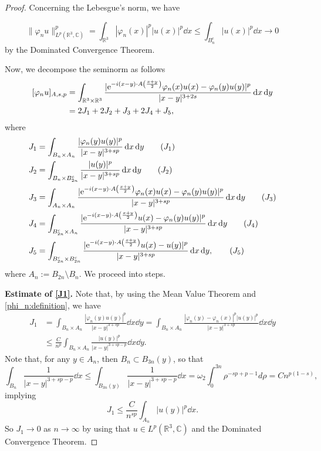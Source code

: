 \documentclass[leqno,11pt]{amsart}
\newcommand{\R}{\mathbb R}
\newcommand{\CC}{\mathbb C}
\newcommand{\C}{\mathbb C}
\numberwithin{equation}{section}
\def\e{{\rm e}}
\newcommand{\expAminus}{\e^{-i(x-y)\cdot A\left(\frac{x+y}{2}\right)}}
\begin{document}
\begin{proof}
Concerning the Lebesgue's norm, we have

$$\|\varphi_n u\|_{L^p(\R^3,\C)}^p=\int_{\R^3}|\varphi_n(x)|^p |u(x)|^p \dd x\le \int_{B_{n}^c} |u(x)|^p \dd x\to 0$$
by the Dominated Convergence Theorem.

Now, we decompose the seminorm as follows 
\begin{equation}
\begin{aligned}
    [\varphi_n u]_{A,s,p}
    &=
    \int_{\R^3 \times \R^3} \frac{|\expAminus\varphi_n(x)u(x)-\varphi_n(y)u(y)|^p}{|x-y|^{3+2s}}\dd x \dd y \\
    &=
    2J_1 + 2J_2 + J_3 +2J_4 + J_5,
\end{aligned}
\end{equation}
where
\begin{align}
       &J_1=\int_{B_n \times A_n}\frac{|\varphi_n(y)u(y)|^p}{|x-y|^{3+sp}}\dd x \dd y \label{J1}\tag{{\it $J_1$}}\\
       &J_2=\int_{B_n \times B_{2n}^c}\frac{|u(y)|^p}{|x-y|^{3+sp}}\dd x \dd y\label{J2}\tag{{\it $J_2$}}\\
       &J_3=\int_{A_n \times A_n}\frac{|\expAminus\varphi_n(x)u(x)-\varphi_n(y)u(y)|^p}{|x-y|^{3+sp}}\dd x \dd y\label{J3}\tag{{\it $J_3$}}\\
       &J_4=\int_{B_{2n}^c \times A_n}\frac{|\expAminus u(x)-\varphi_n(y)u(y)|^p}{|x-y|^{3+sp}}\dd x \dd y\label{J4}\tag{{\it $J_4$}}\\
       &J_5=\int_{B_{2n}^c \times B_{2n}^c}\frac{|\expAminus u(x)- u(y)|^p}{|x-y|^{3+sp}}\dd x \dd y,\label{J5}\tag{{\it $J_5$}}
\end{align}
where $A_n:=B_{2n}\setminus B_n$. We proceed into steps.

{\bf Estimate of \eqref{J1}.}
Note that, by using the Mean Value Theorem and \eqref{phi_n:definition}, we have
$$\begin{aligned}
J_1&=\int_{B_n \times A_n}\frac{|\varphi_n(y)u(y)|^p}{|x-y|^{3+sp}}\dd x \dd y=\int_{B_n \times A_n}\frac{|\varphi_n(y)-\varphi_n(x)|^p|u(y)|^p}{|x-y|^{3+sp}}\dd x \dd y\\
&\le \frac{C}{n^p}\int_{B_n \times A_n}\frac{|u(y)|^p}{|x-y|^{3+sp-p}}\dd x \dd y.
\end{aligned}$$
Note that, for any $y\in A_n$, then $B_n\subset B_{3n}(y)$, so that
$$\int_{B_n}\frac{1}{|x-y|^{3+sp-p}}\dd x \le \int_{B_{3n}(y)}\frac{1}{|x-y|^{3+sp-p}}\dd x 
=\omega_2\int_0^{3n}\rho^{-sp+p-1}d\rho
=Cn^{p(1-s)},$$
implying
$$J_1\le \frac{C}{n^{sp}} \int_{A_n} |u(y)|^p \dd x.$$
So $J_1\to0$ as $n\to\infty$ by using that $u\in L^p(\R^3,\CC)$ and the Dominated Convergence Theorem.






\end{proof}
\end{document}
